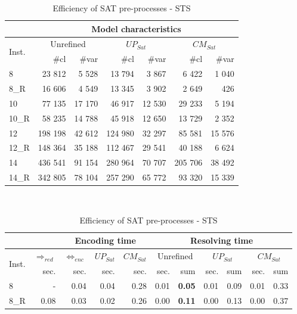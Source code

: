 \documentclass[3p,authoryear,times]{elsarticle}
\newcommand{\rmin}[0]{{\Rightarrow_{red}}}
\newcommand{\enc}[0]{\Leftrightarrow_{enc}}
\begin{document}
{\setlength{\tabcolsep}{0.055cm}
\begin{table}[hbt!]
\caption{Efficiency of SAT pre-processes - STS}
\label{tab:preprocessesSTS}
\begin{center}
\begin{footnotesize}
\begin{tabular}{|l | r | r | r |r  |r |r |}
\cline{2-7}
\multicolumn{1}{c|}{}&\multicolumn{6}{c|}{Model characteristics}\\
\hline
\multirow{2}{*}{Inst.}	&\multicolumn{2}{c|}{Unrefined}		&\multicolumn{2}{c|}{$UP_{Sat}$}	&\multicolumn{2}{c|}{$CM_{Sat}$}\\
&\#cl		&\#var	&\#cl	&\#var	&\#cl	&\#var	\\
\hline
\hline
8		&23 812	&5 528		&13 794	&3 867	&6 422	&1 040	\\
8\_R 		&16 606	&4 549		&13 345	&3 902	&2 649	&426	\\
\hline
10 		&77 135	&17 170		&46 917	&12 530	&29 233	&5 194\\
10\_R 	&58 235	&14 788		&45 918	&12 650	&13 729	&2 352\\
\hline
12 		&198 198	&42 612		&124 980	&32 297	&85 581	&15 576	\\
12\_R 		&148 364	&35 188		&112 467	&29 541	&40 188	&6 624\\
\hline
14 	&436 541	&91 154	&280 964	&70 707	&205 706	&38 492\\
14\_R		&342 805	&78 104	&257 290	&65 772	&93 320	&15 339\\
\hline
\end{tabular}\\[5mm]
\begin{tabular}{|l | r |r| r| r| r| r| r| r| r| r|}
\cline{3-11}
\multicolumn{2}{c|}{}&\multicolumn{3}{c|}{Encoding time}&\multicolumn{6}{c|}{Resolving time}\\
\hline
\multirow{2}{*}{Inst.}&$\rmin$	&$\enc$	&$UP_{Sat}$	&$CM_{Sat}$ 	&\multicolumn{2}{c|}{Unrefined}	&\multicolumn{2}{c|}{$UP_{Sat}$}&\multicolumn{2}{c|}{$CM_{Sat}$}\\
&sec.	&sec.	&sec.	&sec.	&sec.	&sum		&sec.	&sum	&sec.	&sum\\
\hline
\hline
8	&-		&0.04		&0.04	&0.28		&0.01	&{\textbf{0.05}	}&0.01	&0.09	&0.01	&0.33\\
8\_R 	&0.08		&0.03		&0.02	&0.26		&0.00	&\textbf{0.11}		&0.00	&0.13	&0.00	&0.37\\

\end{tabular}
\end{footnotesize}
\end{center}
\end{table}}
\end{document}
